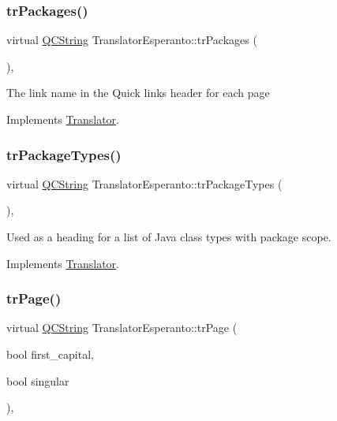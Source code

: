 \subsubsection{\texorpdfstring{trPackages()}{trPackages()}}
{\footnotesize\ttfamily virtual \mbox{\hyperlink{class_q_c_string}{Q\+C\+String}} Translator\+Esperanto\+::tr\+Packages (\begin{DoxyParamCaption}{ }\end{DoxyParamCaption})\hspace{0.3cm}{\ttfamily [inline]}, {\ttfamily [virtual]}}

The link name in the Quick links header for each page 

Implements \mbox{\hyperlink{class_translator}{Translator}}.

\mbox{\label{class_translator_esperanto_a4163807b2b49ac35266860abbaece978}} 
\subsubsection{\texorpdfstring{trPackageTypes()}{trPackageTypes()}}
{\footnotesize\ttfamily virtual \mbox{\hyperlink{class_q_c_string}{Q\+C\+String}} Translator\+Esperanto\+::tr\+Package\+Types (\begin{DoxyParamCaption}{ }\end{DoxyParamCaption})\hspace{0.3cm}{\ttfamily [inline]}, {\ttfamily [virtual]}}

Used as a heading for a list of Java class types with package scope. 

Implements \mbox{\hyperlink{class_translator}{Translator}}.

\mbox{\label{class_translator_esperanto_a38852098b37cca15810bf0e0e1bc0943}} 
\subsubsection{\texorpdfstring{trPage()}{trPage()}}
{\footnotesize\ttfamily virtual \mbox{\hyperlink{class_q_c_string}{Q\+C\+String}} Translator\+Esperanto\+::tr\+Page (\begin{DoxyParamCaption}\item[{bool}]{first\+\_\+capital,  }\item[{bool}]{singular }\end{DoxyParamCaption})\hspace{0.3cm}{\ttfamily [inline]}, {\ttfamily [virtual]}}

